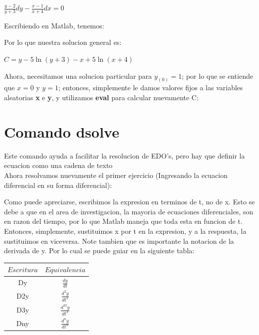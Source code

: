 \documentclass[10pt,a4paper]{article}
\begin{document}
\begin{center}
$\frac{y-2}{y+3}dy-\frac{x-1}{x+4}dx=0$
\end{center}

Escribiendo en Matlab, tenemos:




Por lo que nuestra solucion general es:

\begin{center}
$C=y-5 \ln(y+3)-x+5 \ln(x+4)$
\end{center}

Ahora, necesitamos una solucion particular para $y_{(0)}=1$; por lo que se entiende que $x=0$ y $y=1$; entonces, simplemente le damos valores fijos a las variables aleatorias {\bf x} e {\bf y}, y utilizamos {\bf eval} para calcular nuevamente C:













\section*{Comando dsolve}
Este comando ayuda a facilitar la resolucion de EDO's, pero hay que definir la ecuacion como una cadena de texto
\\
Ahora resolvamos nuevamente el primer ejercicio (Ingresando la ecuacion diferencial en su forma diferencial):


Como puede apreciarse, escribimos la expresion en terminos de t, no de x. Esto se debe a que en el area de investigacion, la mayoria de ecuaciones diferenciales, son en razon del tiempo, por lo que Matlab maneja que toda esta en funcion de t.
\\
Entonces, simplemente, sustituimos x por t en la expresion, y a la respuesta, la sustituimos en viceversa. Note tambien que es importante la notacion de la derivada de y. Por lo cual se puede guiar en la siguiente tabla:

\begin{center}
\begin{tabular}{|c|c| } \hline
 $Escritura$ & $Equivalencia$ \\ \hline
Dy & $\frac{dy}{dt}$ \\ \hline

D2y & $\frac{d^2y}{{dt}^2}$  \\ \hline

D3y & $\frac{d^32y}{{dt}^3}$  \\ \hline

Dny & $\frac{d^ny}{{dt}^n}$\\ \hline

\end{tabular}
\end{center}
\end{document}
